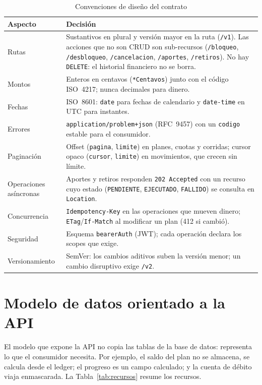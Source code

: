 \begin{table}[H]
\centering
\caption{Convenciones de diseño del contrato}\label{tab:convenciones}
\begin{tabularx}{\linewidth}{@{}>{\raggedright}p{3.2cm} X@{}}
\toprule
\textbf{Aspecto} & \textbf{Decisión} \\
\midrule
Rutas & Sustantivos en plural y versión mayor en la ruta (\texttt{/v1}). Las acciones que no son CRUD son sub-recursos (\texttt{/bloqueo}, \texttt{/desbloqueo}, \texttt{/cancelacion}, \texttt{/aportes}, \texttt{/retiros}). No hay \texttt{DELETE}: el historial financiero no se borra. \\
Montos & Enteros en centavos (\texttt{*Centavos}) junto con el código ISO~4217; nunca decimales para dinero. \\
Fechas & ISO~8601: \texttt{date} para fechas de calendario y \texttt{date-time} en UTC para instantes. \\
Errores & \texttt{application/problem+json} (RFC~9457) con un \texttt{codigo} estable para el consumidor. \\
Paginación & Offset (\texttt{pagina}, \texttt{limite}) en planes, cuotas y corridas; cursor opaco (\texttt{cursor}, \texttt{limite}) en movimientos, que crecen sin límite. \\
Operaciones asíncronas & Aportes y retiros responden \texttt{202 Accepted} con un recurso cuyo estado (\texttt{PENDIENTE}, \texttt{EJECUTADO}, \texttt{FALLIDO}) se consulta en \texttt{Location}. \\
Concurrencia & \texttt{Idempotency-Key} en las operaciones que mueven dinero; \texttt{ETag}/\texttt{If-Match} al modificar un plan (412 si cambió). \\
Seguridad & Esquema \texttt{bearerAuth} (JWT); cada operación declara los scopes que exige. \\
Versionamiento & SemVer: los cambios aditivos suben la versión menor; un cambio disruptivo exige \texttt{/v2}. \\
\bottomrule
\end{tabularx}
\end{table}

\section{Modelo de datos orientado a la API}

El modelo que expone la API no copia las tablas de la base de datos: representa lo que el consumidor necesita. Por ejemplo, el saldo del plan no se almacena, se calcula desde el ledger; el progreso es un campo calculado; y la cuenta de débito viaja enmascarada. La Tabla~\ref{tab:recursos} resume los recursos.

